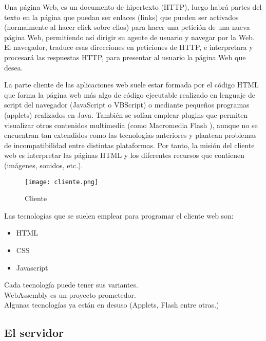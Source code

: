 Una página Web, es un documento de hipertexto (HTTP), luego habrá partes del texto en la página que puedan ser enlaces (links) que pueden ser activados (normalmente al hacer click sobre ellos) para hacer una petición de una nueva página Web, permitiendo así dirigir su agente de usuario y navegar por la Web. El navegador, traduce esas direcciones en peticiones de HTTP, e interpretara y procesará las respuestas HTTP, para presentar al usuario la página Web que desea.

La parte cliente de las aplicaciones web suele estar formada por el código HTML
que forma la página web más algo de código ejecutable realizado en lenguaje de script
del navegador (JavaScript o VBScript) o mediante pequeños programas (applets) realizados en Java. También se solían emplear plugins que permiten visualizar otros
contenidos multimedia (como Macromedia Flash
), aunque no se encuentran tan extendidos como las tecnologías anteriores y plantean problemas de incompatibilidad
entre distintas plataformas. Por tanto, la misión del cliente web es interpretar las
páginas HTML y los diferentes recursos que contienen (imágenes, sonidos, etc.).

\newpage

\begin{wrapfigure}{r}{0.5\textwidth}
	\begin{center}
		\texttt{[image: cliente.png]}
	\end{center}
	\caption{Cliente}
\end{wrapfigure}

Las tecnologías que se suelen emplear para programar el cliente web son:

\begin{itemize}
	\item HTML
	\item CSS
	\item Javascript
\end{itemize}

\begin{remark}
	Cada tecnología puede tener sus variantes.\\
	WebAssembly es un proyecto prometedor.\\
	Algunas tecnologías ya están en desuso (Applets, Flash entre otras.)
\end{remark}

\subsection{El servidor}

